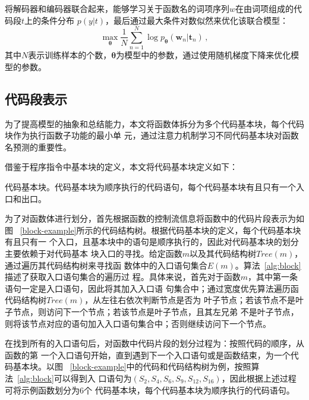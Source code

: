 将解码器和编码器联合起来，能够学习关于函数名的词项序列$w$在由词项组成的代码段$t$上的条件分布
$p(y|t)$，最后通过最大条件对数似然来优化该联合模型：
\begin{equation}
\max \limits_{\bm\theta} \frac{1}{N}\sum_{n=1}^{N} \log p_{\bm\theta}(\bm w_n | 
\bm t_n) \,,
\label{eq:loss}
\end{equation}
其中$N$表示训练样本的个数，$\bm\theta$为模型中的参数，通过使用随机梯度下降来优化模型的参数。

\subsection{代码段表示}
\label{represent}
为了提高模型的抽象和总结能力，本文将函数体拆分为多个代码基本块，每个代码块作为执行函数子功能的最小单
元，通过注意力机制学习不同代码基本块对函数名预测的重要性。

借鉴于程序指令中基本块的定义，本文将代码基本块定义如下：
\begin{Definition}
    代码基本块。代码基本块为顺序执行的代码语句，每个代码基本块有且只有一个入口和出口。
\end{Definition}

为了对函数体进行划分，首先根据函数的控制流信息将函数中的代码片段表示为如图
~\ref{block-example}所示的代码结构树。根据代码基本块的定义，每个代码基本块有且只有一
个入口，且基本块中的语句是顺序执行的，因此对代码基本块的划分主要依赖于对代码基本
块入口的寻找。给定函数$m$以及其代码结构树$Tree(m)$，通过遍历其代码结构树来寻找函
数体中的入口语句集合$E(m)$。算法~\ref{alg:block}描述了获取入口语句集合的遍历过
程。具体来说，首先对于函数$m$，其中第一条语句一定是入口语句，因此将其加入入口语
句集合中；通过宽度优先算法遍历函代码结构树$Tree(m)$，从左往右依次判断节点是否为
叶子节点；若该节点不是叶子节点，则访问下一个节点；若该节点是叶子节点，且其左兄弟
不是叶子节点，则将该节点对应的语句加入入口语句集合中；否则继续访问下一个节点。

在找到所有的入口语句后，对函数中代码片段的划分过程为：按照代码的顺序，从函数的第
一个入口语句开始，直到遇到下一个入口语句或是函数结束，为一个代码基本块。以图
~\ref{block-example}中的代码和代码结构树为例，按照算法~\ref{alg:block}可以得到入
口语句为$(S_2,S_4,S_6,S_9,S_{12},S_{16})$，因此根据上述过程可将示例函数划分为6个
代码基本块，每个代码基本块为顺序执行的代码语句。

